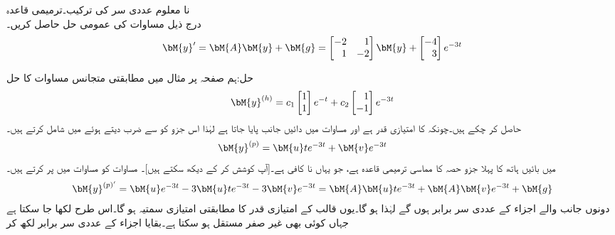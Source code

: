 \quad نا معلوم عددی سر کی ترکیب۔ترمیمی قاعدہ\\
درج ذیل مساوات کی عمومی حل حاصل کریں۔
\begin{align}\label{مساوات_مثال_غیر_متجانس_نا_معلوم_سر_الف}
\bM{y}'=\bM{A}\bM{y}+\bM{g}=\begin{bmatrix*}[r] -2&1\\1&-2 \end{bmatrix*} \bM{y}+\begin{bmatrix*}[r] -4\\3 \end{bmatrix*} e^{-3t}
\end{align}

حل:ہم صفحہ  پر مثال  میں مطابقتی متجانس مساوات کا حل 
\begin{align}\label{مساوات_مثال_غیر_متجانس_نا_معلوم_سر_ب}
\bM{y}^{(h)}=c_1\begin{bmatrix} 1 \\ 1 \end{bmatrix}e^{-t}+c_2\begin{bmatrix*}[r] 1\\ -1 \end{bmatrix*}e^{-3t}
\end{align}
حاصل کر چکے ہیں۔چونکہ  کا   امتیازی قدر ہے اور مساوات  میں دائیں جانب  پایا جاتا ہے لہٰذا  اس جزو کو  سے ضرب دیتے ہوئے  میں شامل کرتے ہیں۔
\begin{align}\label{مساوات_مثال_غیر_متجانس_نا_معلوم_سر_پ}
\bM{y}^{(p)}=\bM{u}te^{-3t}+\bM{v}e^{-3t} \quad \quad 
\end{align} 
 میں بائیں ہاتھ کا پہلا جزو حصہ  کا مماسی  ترمیمی قاعدہ ہے، جو یہاں نا کافی ہے۔[آپ کوشش کر کے دیکھ سکتے ہیں]۔ مساوات  کو مساوات  میں پر کرتے ہیں۔
\begin{align*}
\bM{y}^{(p)'}=\bM{u}e^{-3t}-3\bM{u}te^{-3t}-3\bM{v}e^{-3t}=\bM{A}\bM{u}te^{-3t}+\bM{A}\bM{v}e^{-3t}+\bM{g}
\end{align*}
دونوں جانب  والے اجزاء کے عددی سر برابر ہوں گے لہٰذا  ہو گا۔یوں  قالب کے امتیازی قدر  کا مطابقتی امتیازی سمتیہ  ہو گا۔اس طرح  لکھا جا سکتا ہے جہاں  کوئی بھی غیر صفر مستقل ہو سکتا ہے۔بقایا اجزاء کے عددی سر برابر لکھ کر
